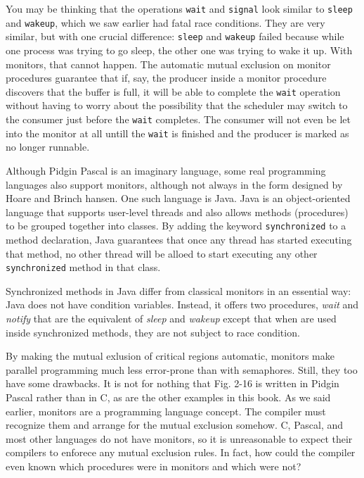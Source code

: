 \documentclass{book}
\newcommand {\sys} [1] {\textsl{#1}}
\newcommand {\cmd} [1] {\texttt{#1}}
\begin{document}
You may be thinking that the operations \cmd{wait} and \cmd{signal} look similar to \cmd{sleep} and \cmd{wakeup},
which we saw earlier had fatal race conditions.
They are very similar, but with one crucial difference:
\cmd{sleep} and \cmd{wakeup} failed because while one process was trying to go sleep, the other one was trying to wake it up.
With monitors, that cannot happen.
The automatic mutual exclusion on monitor procedures guarantee that if, say, 
the producer inside a monitor procedure discovers that the buffer is full, 
it will be able to complete the \cmd{wait} operation without having to worry about the possibility 
that the scheduler may switch to the consumer just before the \cmd{wait} completes.
The consumer will not even be let into the monitor at all untill the \cmd{wait} is finished 
and the producer is marked as no longer runnable.

Although Pidgin Pascal is an imaginary language, some real programming languages also support monitors,
although not always in the form designed by Hoare and Brinch hansen.
One such language is Java.
Java is an object-oriented language that supports user-level threads and also allows methods (procedures) to be grouped together into classes.
By adding the keyword \cmd{synchronized} to a method declaration,
Java guarantees that once any thread has started executing that method,
no other thread will be alloed to start executing any other \cmd{synchronized} method in that class.

Synchronized methods in Java differ from classical monitors in an essential way:
Java does not have condition variables.
Instead, it offers two procedures, \sys{wait} and \sys{notify} that are the equivalent of \sys{sleep} and \sys{wakeup} except
that when are used inside synchronized methods, they are not subject to race condition.

By making the mutual exlusion of critical regions automatic,
monitors make parallel programming much less error-prone than with semaphores.
Still, they too have some drawbacks.
It is not for nothing that Fig. 2-16 is written in Pidgin Pascal rather than in C,
as are the other examples in this book.
As we said earlier, monitors are a programming language concept.
The compiler must recognize them and arrange for the mutual exclusion somehow.
C, Pascal, and most other languages do not have monitors,
so it is unreasonable to expect their compilers to enforece any mutual exclusion rules.
In fact, how could the compiler even known which procedures were in monitors and which were not?
\end{document}
